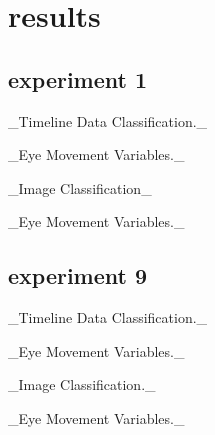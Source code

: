\section{results}





\subsection{experiment 1}
_Timeline Data Classification._

_Eye Movement Variables._ %

_Image Classification_

_Eye Movement Variables._ %


\subsection{experiment 9}

_Timeline Data Classification._

_Eye Movement Variables._ %

_Image Classification._

_Eye Movement Variables._ %
